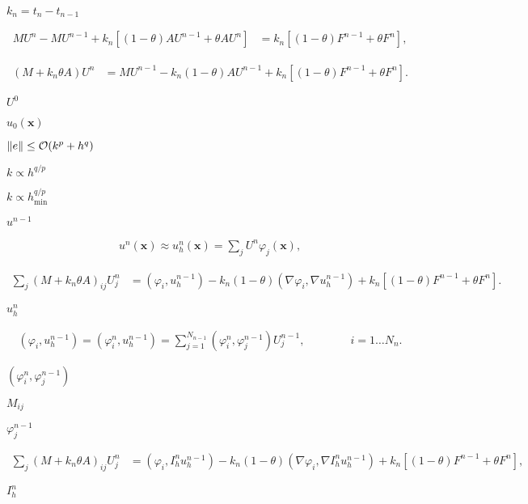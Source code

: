 \documentclass{article}
\begin{document}
$k_n=t_n-t_{n-1}$
\pagebreak

\begin{align*} M U^n-MU^{n-1} + k_n \left[ (1-\theta)A U^{n-1} + \theta A U^n \right] &= k_n \left[ (1-\theta)F^{n-1} + \theta F^n \right], \end{align*}
\pagebreak

\begin{align*} (M + k_n \theta A) U^n &= MU^{n-1} - k_n (1-\theta)A U^{n-1} + k_n \left[ (1-\theta)F^{n-1} + \theta F^n \right]. \end{align*}
\pagebreak

$U^0$
\pagebreak

$u_0(\mathbf x)$
\pagebreak

$\|e\| \le {\cal O}(k^p + h^q)$
\pagebreak

$k \propto h^{q/p}$
\pagebreak

$k \propto h_{\text{min}}^{q/p}$
\pagebreak

$u^{n-1}$
\pagebreak

\begin{align*} u^n(\mathbf x)\approx u_h^n(\mathbf x) = \sum_j U^n \varphi_j(\mathbf x), \end{align*}
\pagebreak

\begin{align*} \sum_j (M + k_n \theta A)_{ij} U^n_j &= (\varphi_i, u_h^{n-1}) - k_n (1-\theta)(\nabla \varphi_i, \nabla u_h^{n-1}) + k_n \left[ (1-\theta)F^{n-1} + \theta F^n \right]. \end{align*}
\pagebreak

$u_h^n$
\pagebreak

\begin{align*} (\varphi_i, u_h^{n-1}) = (\varphi_i^n, u_h^{n-1}) = \sum_{j=1}^{N_{n-1}} (\varphi_i^n, \varphi_j^{n-1}) U^{n-1}_j, \qquad\qquad i=1\ldots N_n. \end{align*}
\pagebreak

$(\varphi_i^n, \varphi_j^{n-1})$
\pagebreak

$M_{ij}$
\pagebreak

$\varphi_j^{n-1}$
\pagebreak

\begin{align*} \sum_j (M + k_n \theta A)_{ij} U^n_j &= (\varphi_i, I_h^n u_h^{n-1}) - k_n (1-\theta)(\nabla \varphi_i, \nabla I_h^n u_h^{n-1}) + k_n \left[ (1-\theta)F^{n-1} + \theta F^n \right], \end{align*}
\pagebreak

$I_h^n$
\pagebreak
\end{document}

